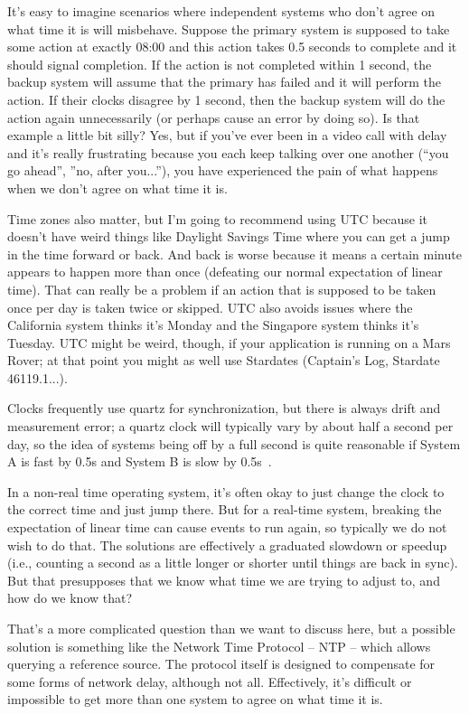 It's easy to imagine scenarios where independent systems who don't agree on what time it is will misbehave. Suppose the primary system is supposed to take some action at exactly 08:00 and this action takes 0.5 seconds to complete and it should signal completion. If the action is not completed within 1 second, the backup system will assume that the primary has failed and it will perform the action. If their clocks disagree by 1 second, then the backup system will do the action again unnecessarily (or perhaps cause an error by doing so). Is that example a little bit silly? Yes, but if you've ever been in a video call with delay and it's really frustrating because you each keep talking over one another (``you go ahead'', ''no, after you...''), you have experienced the pain of what happens when we don't agree on what time it is.

Time zones also matter, but I'm going to recommend using UTC because it doesn't have weird things like Daylight Savings Time where you can get a jump in the time forward or back. And back is worse because it means a certain minute appears to happen more than once (defeating our normal expectation of linear time). That can really be a problem if an action that is supposed to be taken once per day is taken twice or skipped. UTC also avoids issues where the California system thinks it's Monday and the Singapore system thinks it's Tuesday. UTC might be weird, though, if your application is running on a Mars Rover; at that point you might as well use Stardates (Captain's Log, Stardate 46119.1...).


Clocks frequently use quartz for synchronization, but there is always drift and measurement error; a quartz clock will typically vary by about half a second per day, so the idea of systems being off by a full second is quite reasonable if System A is fast by 0.5s and System B is slow by 0.5s~\cite{mte241}.

In a non-real time operating system, it's often okay to just change the clock to the correct time and just jump there. But for a real-time system, breaking the expectation of linear time can cause events to run again, so typically we do not wish to do that. The solutions are effectively a graduated slowdown or speedup (i.e., counting a second as a little longer or shorter until things are back in sync). But that presupposes that we know what time we are trying to adjust to, and how do we know that?

That's a more complicated question than we want to discuss here, but a possible solution is something like the Network Time Protocol -- NTP -- which allows querying a reference source. The protocol itself is designed to compensate for some forms of network delay, although not all. Effectively, it's difficult or impossible to get more than one system to agree on what time it is. 

